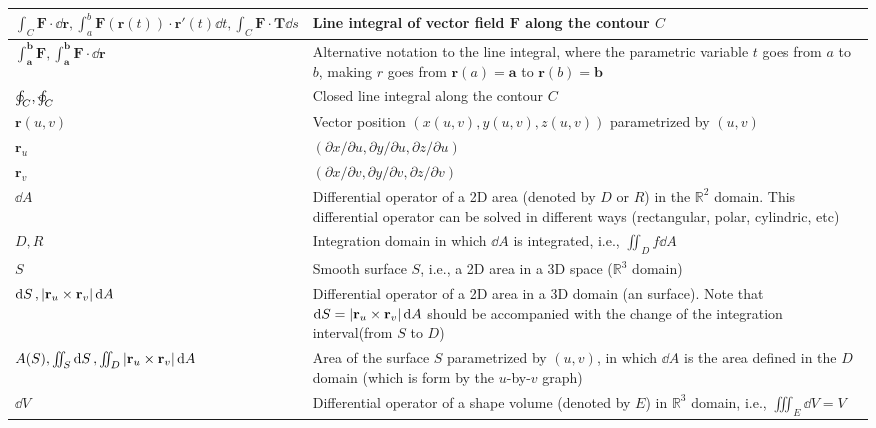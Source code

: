 \documentclass{article}
\begin{document}
\begin{xltabular}{\textwidth}{XX}
    \(\int_C \mathbf{F}\cdot\dd{\mathbf{r}}, \int_a^b \mathbf{F}(\mathbf{r}(t)) \cdot \mathbf{r}'(t) \dd{t}, \int_C \mathbf{F}\cdot\mathbf{T} \dd{s}\) & Line integral of vector field \(\mathbf{F}\) along the contour \(C\)  \cite{apostolCalculus2ndEdn1967,stewartCalculus2011} \\ \hline
    \(\int_\mathbf{a}^\mathbf{b} \mathbf{F}, \int_\mathbf{a}^\mathbf{b} \mathbf{F}\cdot\dd{\mathbf{r}}\) & Alternative notation to the line integral, where the parametric variable \(t\) goes from \(a\) to \(b\), making \(r\) goes from \(\mathbf{r}(a) = \mathbf{a}\) to \(\mathbf{r}(b) = \mathbf{b}\) \cite{apostolCalculus2ndEdn1967} \\ \hline
    \(\oint_C, \varointctrclockwise_C\) & Closed line integral along the contour \(C\) \\ \hline
    \(\mathbf{r}(u,v)\) & Vector position \((x(u,v), y(u,v), z(u,v))\) parametrized by \((u,v)\)\\ \hline
    \(\mathbf{r}_u\) & \((\partial x/ \partial u, \partial y/ \partial u, \partial z/ \partial u)\)\\ \hline
    \(\mathbf{r}_v\) & \((\partial x/ \partial v, \partial y/ \partial v, \partial z/ \partial v)\)\\ \hline
    \(\dd{A}\) & Differential operator of a 2D area (denoted by \(D\) or \(R\)) in the \(\mathbb{R}^2\) domain. This differential operator can be solved in different ways (rectangular, polar, cylindric, etc) \cite{stewartCalculus2011} \\ \hline
    \(D, R\) & Integration domain in which \(\dd{A}\) is integrated, i.e., \(\iint_D f \dd{A}\) \cite{stewartCalculus2011} \\ \hline
    \(S\)& Smooth surface \(S\), i.e., a 2D area in a 3D space (\(\mathbb{R}^3\) domain) \\ \hline
    \(\dd{S}, \abs{\mathbf{r}_u\times\mathbf{r}_v} \dd{A} \)& Differential operator of a 2D area in a 3D domain (an surface). Note that \(\dd{S} = \abs{\mathbf{r}_u\times\mathbf{r}_v} \dd{A}\) should be accompanied with the change of the integration interval(from \(S\) to \(D\)) \\ \hline
    \(A(S), \iint_S \dd{S}, \iint_D \abs{\mathbf{r}_u\times\mathbf{r}_v} \dd{A}\) & Area of the surface \(S\) parametrized by \((u,v)\), in which \(\dd{A}\) is the area defined in the \(D\) domain (which is form by the \(u\)-by-\(v\) graph)\\ \hline
    \(\dd{V}\) & Differential operator of a shape volume (denoted by \(E\)) in \(\mathbb{R}^3\) domain, i.e., \(\iiint_E \dd{V} = V\) \\ \hline

\end{xltabular}
\end{document}

